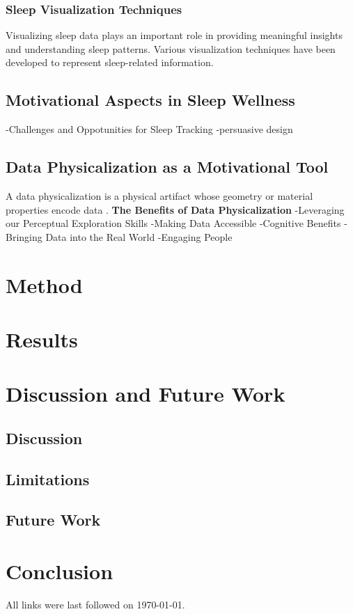\documentclass[
  a4paper,  %
  twoside,  %
  bibliography=totoc,
  headsepline,
  cleardoublepage=empty,
  parskip=half,
  draft=false
]{scrbook}
\begin{document}
\subsection{Sleep Visualization Techniques}

Visualizing sleep data plays an important role in providing meaningful insights and understanding sleep patterns. Various visualization techniques have been developed to represent sleep-related information.
\section{Motivational Aspects in Sleep Wellness}
-Challenges and Oppotunities for Sleep Tracking \cite{liu_bed_2015}
\newline
-persuasive design
\section{Data Physicalization as a Motivational Tool}
A data physicalization is a physical artifact whose geometry or material properties encode data \cite{jansen_opportunities_2015}.
\newline
\newline
\textbf{The Benefits of Data Physicalization}
-Leveraging our Perceptual Exploration Skills
\newline
-Making Data Accessible
\newline
-Cognitive Benefits
\newline
-Bringing Data into the Real World
\newline
-Engaging People


\chapter{Method}

\chapter{Results}

\chapter{Discussion and Future Work}
\section{Discussion}
\section{Limitations}
\section{Future Work}

\chapter{Conclusion}


\printbibliography

All links were last followed on \today.

\appendix
%

\pagestyle{empty}
\renewcommand*{\chapterpagestyle}{empty}
\Affirmation
\end{document}
